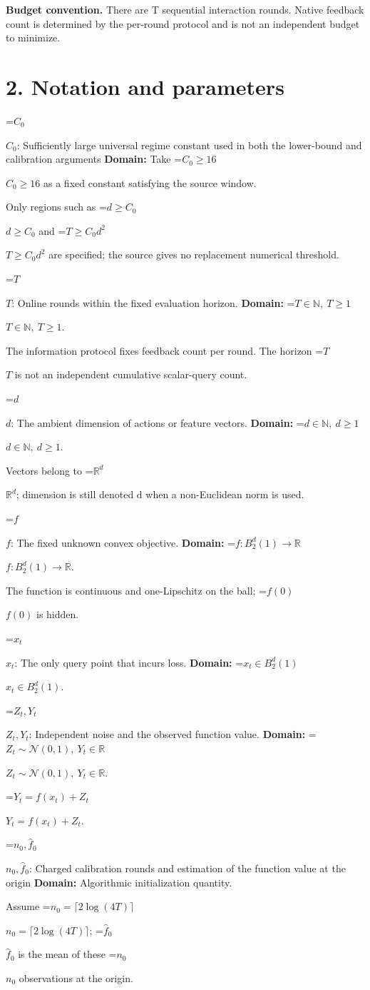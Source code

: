 \documentclass[10pt,a4paper]{article}
\newcommand{\AtlasMath}[1]{\par\begingroup\centering\setbox0=\hbox{$\displaystyle #1$}\ifdim\wd0>1.4\linewidth\typeout{ATLAS WIDE FORMULA: \the\wd0}\fi\ifdim\wd0>\linewidth\resizebox{\linewidth}{!}{\box0}\else\box0\fi\par\endgroup}
\newcommand{\AtlasInlineMath}[1]{\begingroup\setbox0=\hbox{$#1$}\ifdim\wd0>.4\linewidth\endgroup\AtlasMath{#1}\else\endgroup$#1$\fi}
\begin{document}
\textbf{Budget convention.} There are T sequential interaction rounds. Native feedback count is determined by the per-round protocol and is not an independent budget to minimize.

\section{2. Notation and parameters}
\AtlasInlineMath{C_0}: Sufficiently large universal regime constant used in both the lower-bound and calibration arguments \textbf{Domain:} Take \AtlasInlineMath{C_0\ge16} as a fixed constant satisfying the source window.

Only regions such as \AtlasInlineMath{d\ge C_0} and \AtlasInlineMath{T\ge C_0d^2} are specified; the source gives no replacement numerical threshold.

\AtlasInlineMath{T}: Online rounds within the fixed evaluation horizon. \textbf{Domain:} \AtlasInlineMath{T\in\mathbb N,\ T\ge1}.

The information protocol fixes feedback count per round. The horizon \AtlasInlineMath{T} is not an independent cumulative scalar-query count.

\AtlasInlineMath{d}: The ambient dimension of actions or feature vectors. \textbf{Domain:} \AtlasInlineMath{d\in\mathbb N,\ d\ge1}.

Vectors belong to \AtlasInlineMath{\mathbb R^d}; dimension is still denoted d when a non-Euclidean norm is used.

\AtlasInlineMath{f}: The fixed unknown convex objective. \textbf{Domain:} \AtlasInlineMath{f:B_2^d(1)\to\mathbb R}.

The function is continuous and one-Lipschitz on the ball; \AtlasInlineMath{f(0)} is hidden.

\AtlasInlineMath{x_t}: The only query point that incurs loss. \textbf{Domain:} \AtlasInlineMath{x_t\in B_2^d(1)}.

\AtlasInlineMath{Z_t,Y_t}: Independent noise and the observed function value. \textbf{Domain:} \AtlasInlineMath{Z_t\sim\mathcal N(0,1),\ Y_t\in\mathbb R}.

\AtlasInlineMath{Y_t=f(x_t)+Z_t}.

\AtlasInlineMath{n_0,\widehat f_0}: Charged calibration rounds and estimation of the function value at the origin \textbf{Domain:} Algorithmic initialization quantity.

Assume \AtlasInlineMath{n_0=\lceil2\log(4T)\rceil}; \AtlasInlineMath{\widehat f_0} is the mean of these \AtlasInlineMath{n_0} observations at the origin.
\end{document}
